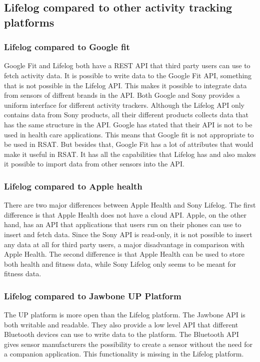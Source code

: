 \documentclass{cslthse-msc}
\begin{document}
\subsection{Lifelog compared to other activity tracking platforms}

\subsubsection{Lifelog compared to Google fit}
Google Fit and Lifelog both have a REST API that third party users can use to fetch activity data. It is possible to write data to the Google Fit API, something that is not possible in the Lifelog API. This makes it possible to integrate data from sensors of diffrent brands in the API. Both Google and Sony provides a uniform interface for different activity trackers. Although the Lifelog API only contains data from Sony products, all their different products collects data that has the same structure in the API. Google has stated that their API is not to be used in health care applications. This means that Google fit is not appropriate to be used in RSAT. But besides that, Google Fit has a lot of attributes that would make it useful in RSAT. It has all the capabilities that Lifelog has and also makes it possible to import data from other sensors into the API. 



\subsubsection{Lifelog compared to Apple health} 

There are two major differences between Apple Health and Sony Lifelog. The first difference is that Apple Health does not have a cloud API. Apple, on the other hand, has an API that applications that users run on their phones can use to insert and fetch data. Since the Sony API is read-only, it is not possible to insert any data at all for third party users, a major disadvantage in comparison with Apple Health. The second difference is that Apple Health can be used to store both health and fitness data, while Sony Lifelog only seems to be meant for fitness data. 

\subsubsection{Lifelog compared to Jawbone UP Platform}

The UP platform is more open than the Lifelog platform. The Jawbone API is both writable and readable. They also provide a low level API that different Bluetooth devices can use to write data to the platform. The Bluetooth API gives sensor manufacturers the possibility to create a sensor without the need for a companion application. This functionality is missing in the Lifelog platform.   
\end{document}
